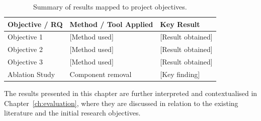\begin{table}[ht]
    \centering
    \caption{Summary of results mapped to project objectives.}
    \label{tab:results-summary}
    \begin{tabular}{p{4cm} p{5cm} p{4cm}}
        \hline
        \textbf{Objective / RQ} & \textbf{Method / Tool Applied} &
        \textbf{Key Result} \\
        \hline
        Objective 1             & [Method used]                  & [Result obtained] \\
        Objective 2             & [Method used]                  & [Result obtained] \\
        Objective 3             & [Method used]                  & [Result obtained] \\
        Ablation Study          & Component removal              & [Key finding]     \\
        \hline
    \end{tabular}
\end{table}

The results presented in this chapter are further interpreted and contextualised
in Chapter~\ref{ch:evaluation}, where they are discussed in relation to the
existing literature and the initial research objectives.